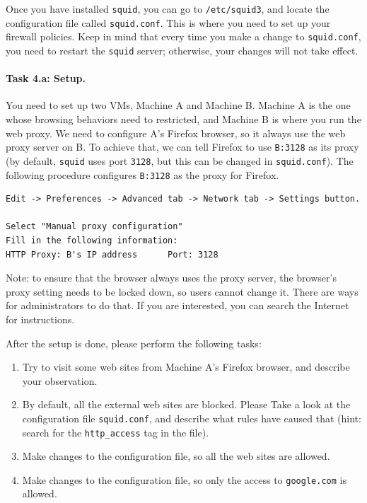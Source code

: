 Once you have installed {\tt squid}, you can go to {\tt /etc/squid3},
and locate the configuration file called {\tt squid.conf}. This is 
where you need to set up your firewall policies. Keep in mind that 
every time you make a change to {\tt squid.conf}, you need to 
restart the {\tt squid} server; otherwise, your changes will 
not take effect.


\paragraph{Task 4.a: Setup.} You need to set up two VMs, Machine A 
and Machine B. Machine A is the one whose browsing behaviors need to restricted,
and Machine B is where you run the web proxy. We need to configure
A's Firefox browser, so it always use the web proxy server on B.
To achieve that, we can tell Firefox to
use {\tt B:3128} as its proxy (by default, {\tt squid} uses 
port {\tt 3128}, but this can be changed in {\tt squid.conf}).
The following procedure
configures {\tt B:3128} as the proxy for Firefox.
\begin{Verbatim}[frame=single] 
Edit -> Preferences -> Advanced tab -> Network tab -> Settings button.

Select "Manual proxy configuration"
Fill in the following information:
HTTP Proxy: B's IP address      Port: 3128
\end{Verbatim}

Note: to ensure that the browser always uses the proxy server, 
the browser's proxy setting needs to be locked down, so users cannot 
change it. There are ways for administrators to do that. If you are 
interested, you can search the Internet for instructions.


After the setup is done, please perform the following tasks:
\begin{enumerate}
\item Try to visit some web sites from Machine A's
Firefox browser, and describe your observation. 

\item By default, all the external web sites are blocked. 
Please Take a look at the configuration file
{\tt squid.conf}, and describe what rules have caused that (hint: 
search for the {\tt http\_access} tag in the file).

\item Make changes to the configuration file, so 
all the web sites are allowed. 

\item Make changes to the configuration file, so only
the access to {\tt google.com} is allowed. 
\end{enumerate}

